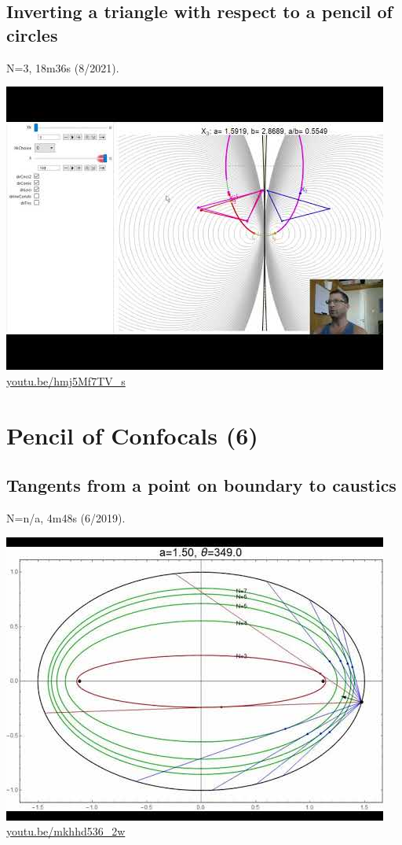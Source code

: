 \documentclass[12pt]{amsart}
\begin{document}
\subsection{Inverting a triangle with respect to a pencil of circles}
\label{vid:hmj5Mf7TV_s}
\noindent N=3, 18m36s (8/2021). 
\begin{center}\includegraphics[width=.5\textwidth]{pics/hmj5Mf7TV_s.jpg} \\ 
\href{https://youtu.be/hmj5Mf7TV_s}{\url{youtu.be/hmj5Mf7TV\_s}}\end{center}
% 


\section{Pencil of Confocals (6)}

\subsection{Tangents from a point on boundary to caustics}
\label{vid:mkhhd536_2w}
\noindent N=n/a, 4m48s (6/2019). 
\begin{center}\includegraphics[width=.5\textwidth]{pics/mkhhd536_2w.jpg} \\ 
\href{https://youtu.be/mkhhd536_2w}{\url{youtu.be/mkhhd536\_2w}}\end{center}
% 
\end{document}

